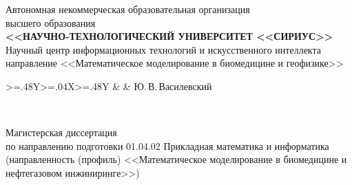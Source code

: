 \begin{spacing}{1.0}
\fontsize{12}{14.5}\selectfont

\begin{center}
    Автономная некоммерческая образовательная организация \\ высшего образования \\
    \textbf{<<НАУЧНО-ТЕХНОЛОГИЧЕСКИЙ УНИВЕРСИТЕТ <<СИРИУС>>} \\
    \vspace{0.66\baselineskip}
    Научный центр информационных технологий и искусственного интеллекта \\
    \vspace{0.66\baselineskip}
    направление <<Математическое моделирование в биомедицине и геофизике>> \\

    \vspace{1.5\baselineskip}

    \begin{tabularx}{\textwidth}{>{\hsize=.48\hsize}Y>{\hsize=.04\hsize}X>{\hsize=.48\hsize}Y}
        & & 
            {Ю.\,В.\,Василевский}
    \end{tabularx}

    \vspace{\fill}

    {\MakeUppercase{\thetitle}} \\

    \vspace{0.5\baselineskip}

    Магистерская диссертация \\
    по направлению подготовки 01.04.02 Прикладная математика и информатика \\
    (направленность (профиль) <<Математическое моделирование в биомедицине и нефтегазовом инжиниринге>>) \\

    \vspace{\fill}


\end{center}
\end{spacing}
